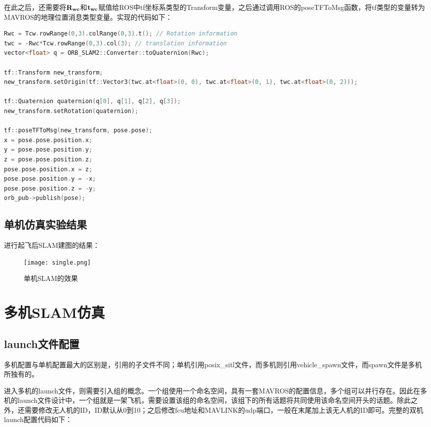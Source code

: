 在此之后，还需要将$\bf{R_{wc}}$和$\bf{t_{wc}}$赋值给ROS中tf坐标系类型的Transform变量，之后通过调用ROS的poseTFToMsg函数，将tf类型的变量转为MAVROS的地理位置消息类型变量。实现的代码如下：

\begin{lstlisting}[language={C++}]
Rwc = Tcw.rowRange(0,3).colRange(0,3).t(); // Rotation information
twc = -Rwc*Tcw.rowRange(0,3).col(3); // translation information
vector<float> q = ORB_SLAM2::Converter::toQuaternion(Rwc);

tf::Transform new_transform;
new_transform.setOrigin(tf::Vector3(twc.at<float>(0, 0), twc.at<float>(0, 1), twc.at<float>(0, 2)));

tf::Quaternion quaternion(q[0], q[1], q[2], q[3]);
new_transform.setRotation(quaternion);

tf::poseTFToMsg(new_transform, pose.pose);
x = pose.pose.position.x;
y = pose.pose.position.y;
z = pose.pose.position.z;
pose.pose.position.x = z;
pose.pose.position.y = -x;
pose.pose.position.z = -y;
orb_pub->publish(pose);
\end{lstlisting}

\subsection{单机仿真实验结果} \label{4.2.4}


进行起飞后SLAM建图的结果：

\begin{figure}[!ht]
	\centering
	\texttt{[image: single.png]}
	\caption{单机SLAM的效果}
	\label{fig4-6}
\end{figure}




\section{多机SLAM仿真}


\subsection{launch文件配置} \label{4.3.1}

多机配置与单机配置最大的区别是，引用的子文件不同；单机引用posix\_sitl文件，而多机则引用vehicle\_spawn文件，而spawn文件是多机所独有的。

进入多机的launch文件，则需要引入组的概念。一个组使用一个命名空间，具有一套MAVROS的配置信息，多个组可以并行存在。因此在多机的launch文件设计中，一个组就是一架飞机，需要设置该组的命名空间，该组下的所有话题将共同使用该命名空间开头的话题。除此之外，还需要修改无人机的ID，ID默认从0到10；之后修改fcu地址和MAVLINK的udp端口，一般在末尾加上该无人机的ID即可。完整的双机launch配置代码如下：

